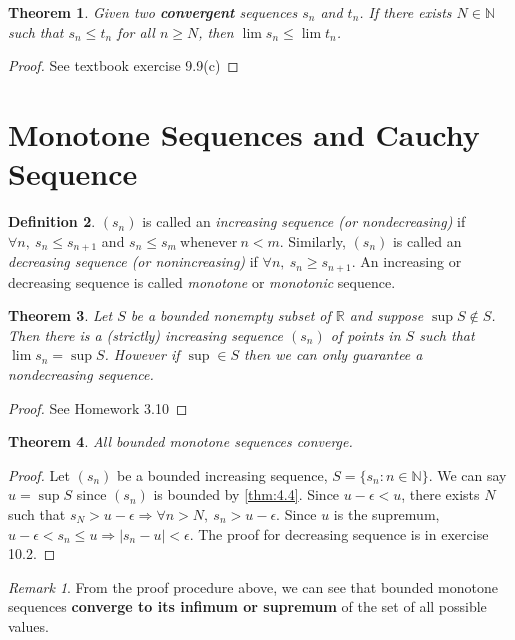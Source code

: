 \documentclass[12pt, lettersize]{book}
\theoremstyle{plain}
\newtheorem{thm}{Theorem}[section]
\theoremstyle{definition}
\newtheorem{dfn}[thm]{Definition}
\theoremstyle{remark}
\newtheorem*{rem}{Remark}
\newcommand{\R}{\mathbb{R}}
\newcommand{\N}{\mathbb{N}}
\begin{document}
		\begin{thm}
		Given two \textbf{convergent} sequences $s_n$ and $t_n$. If there exists $N\in\N$ such that $s_n\leq t_n$ for all $n\geq N$, then $\lim s_n\leq\lim t_n$.
		\end{thm}
		\begin{proof}
			See textbook exercise 9.9(c)
		\end{proof}
		\newpage
	\section{Monotone Sequences and Cauchy Sequence}
		\begin{dfn}
		$(s_n)$ is called an \emph{increasing sequence (or nondecreasing)} if $\forall n,\ s_n\leq s_{n+1}$ and $s_n\leq s_m\ \text{whenever}\ n<m$.
		Similarly, $(s_n)$ is called an \emph{decreasing sequence (or nonincreasing)} if $\forall n,\ s_n\geq s_{n+1}$. An increasing or decreasing sequence is called \emph{monotone} or \emph{monotonic} sequence.
		\end{dfn}
		
		\begin{thm}
			Let $S$ be a bounded nonempty subset of $\R$ and suppose $\sup S\notin S$. Then there is a (strictly) increasing sequence $(s_n)$ of points in $S$ such that $\lim s_n=\sup S$. However if $\sup\in S$ then we can only guarantee a nondecreasing sequence.
		\end{thm}
		\begin{proof}
			See Homework 3.10
		\end{proof}
	
		\begin{thm}\label{def:bounded monotone seq}
		All bounded monotone sequences converge.
		\end{thm}
		\begin{proof}
		Let $(s_n)$ be a bounded increasing sequence, $S=\{s_n: n\in \mathbb{N}\}$. We can say $u=\sup S$ since $(s_n)$ is bounded by \ref{thm:4.4}. 
		Since $u-\epsilon<u$, there exists $N$ such that $s_N>u-\epsilon \Rightarrow \forall n>N,\ s_n>u-\epsilon$. Since $u$ is the supremum, $u-\epsilon<s_n\leq u \Rightarrow |s_n-u|<\epsilon$.
		The proof for decreasing sequence is in exercise 10.2.
		\end{proof}
		\begin{rem}
		From the proof procedure above, we can see that bounded monotone sequences \textbf{converge to its infimum or supremum} of the set of all possible values.
		\end{rem}
		
\end{document}

